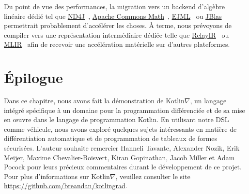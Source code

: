 Du point de vue des performances, la migration vers un backend d'algèbre linéaire dédié tel que \href{https://deeplearning4j.org/docs/latest/nd4j-overview}{ND4J}~\citep{team2016nd4j}, \href{https://commons.apache. org/proper/commons-math/}{Apache Commons Math}~\citep{developers2012apache}, \href{http://ejml.org}{EJML}~\citep{abeles2010efficient} ou \href{http://jblas.org/}{JBlas}~\citep{braun2011jblas} permettrait probablement d'accélérer les choses. À terme, nous prévoyons de compiler vers une représentation intermédiaire dédiée telle que \href{https://docs.tvm.ai/dev/relay_intro.html}{RelayIR}~\citep{roesch2018relay} ou \href{https://www.tensorflow.org/mlir}{MLIR}~\citep{mlir} afin de recevoir une accélération matérielle sur d'autres plateformes.

\section{Épilogue}

Dans ce chapitre, nous avons fait la démonstration de Kotlin$\nabla$, un langage intégré spécifique à un domaine pour la programmation différenciée et de sa mise en œuvre dans le langage de programmation Kotlin. En utilisant notre DSL comme véhicule, nous avons exploré quelques sujets intéressants en matière de différentiation automatique et de programmation de tableaux de formes sécurisées. L'auteur souhaite remercier Hanneli Tavante, Alexander Nozik, Erik Meijer, Maxime Chevalier-Boisvert, Kiran Gopinathan, Jacob Miller et Adam Pocock pour leurs précieux commentaires durant le développement de ce projet. Pour plus d'informations sur Kotlin$\nabla$, veuillez consulter le site \url{https://github.com/breandan/kotlingrad}.
